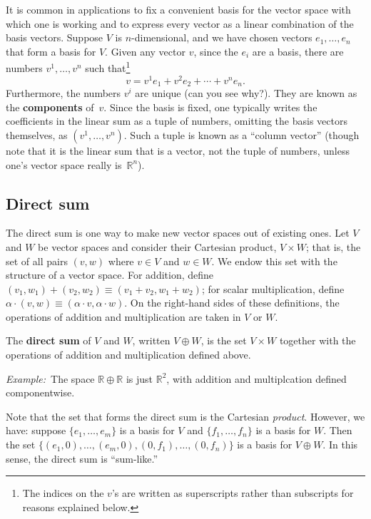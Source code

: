 \documentclass[10pt, a4paper, twocolumn]{article}
\newcommand{\R}{\mathbb{R}}
\newcommand{\defn}[1]{\textbf{#1}}
\newcommand{\eg}{\emph{Example:}\relax}
\begin{document}
It is common in applications to fix a convenient basis for the vector space with
which one is working and to express every vector as a linear combination of the
basis vectors. Suppose $V$ is $n$-dimensional, and we have chosen vectors $e_1,
\dotsc, e_n$ that form a basis for $V$. Given any vector $v$, since the $e_i$
are a basis, there are numbers $v^1, \dotsc, v^n$ such that\footnote{The indices
  on the $v$'s are written as superscripts rather than subscripts for reasons
  explained below.}
\begin{equation}
v = v^1 e_1 + v^2 e_2 + \dotsb + v^n e_n.
\end{equation}
Furthermore, the numbers $v^i$ are unique (can you see why?). They are known as
the \defn{components} of~$v$. Since the basis is fixed, one typically writes the
coefficients in the linear sum as a tuple of numbers, omitting the basis vectors
themselves, as $(v^1, \dotsc, v^n)$. Such a tuple is known as a “column vector”
(though note that it is the linear sum that is a vector, not the tuple of
numbers, unless one's vector space really is~$\R^n$).

\subsection{Direct sum}

The direct sum is one way to make new vector spaces out of existing ones. Let
$V$ and $W$ be vector spaces and consider their Cartesian product, $V \times W$; that
is, the set of all pairs $(v, w)$ where $v\in V$ and $w\in W$. We endow this set
with the structure of a vector space. For addition, define $(v_1, w_1) + (v_2,
w_2) \equiv (v_1 + v_2, w_1 + w_2)$; for scalar multiplication, define $\alpha \cdot (v, w) \equiv
(\alpha\cdot v, \alpha\cdot w)$. On the right-hand sides of these definitions, the operations of
addition and multiplication are taken in $V$ or $W$.

The \defn{direct sum} of $V$ and $W$, written $V \oplus W$, is the set $V \times W$
together with the operations of addition and multiplication defined above.

\eg\ The space $\R \oplus \R$ is just $\R^2$, with addition and multiplcation defined
componentwise.

Note that the set that forms the direct sum is the Cartesian
\emph{product}. However, we have: suppose $\{e_1, \dotsc, e_m\}$ is a basis for
$V$ and $\{f_1, \dotsc, f_n\}$ is a basis for $W$. Then the set $\{(e_1, 0),
\dotsc, (e_m, 0), (0, f_1), \dotsc, (0, f_n) \}$ is a basis for $V \oplus W$. In this
sense, the direct sum is “sum-like.”
\end{document}
